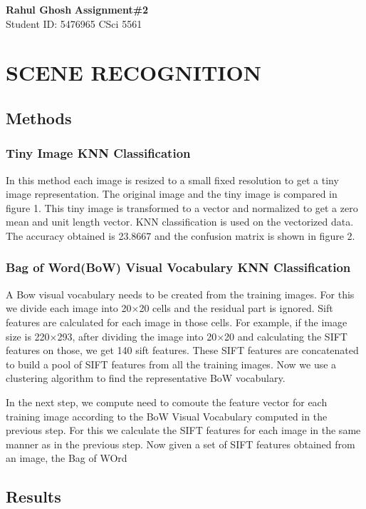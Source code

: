 \documentclass[letter, 10pt]{article}
\begin{document}
\noindent
\large \textbf{Rahul Ghosh} \hfill \textbf{Assignment\#2}\\
\normalsize Student ID: 5476965 \hfill CSci 5561\\

\section*{SCENE RECOGNITION}
\subsection*{Methods}
\subsubsection*{Tiny Image KNN Classification}
In this method each image is resized to a small fixed resolution to get a tiny image representation. The original image and the tiny image is compared in figure 1. This tiny image is transformed to a vector and normalized to get a zero mean and unit length vector. KNN classification is used on the vectorized data. The accuracy obtained is 23.8667 and the confusion matrix is shown in figure 2.

\subsubsection*{Bag of Word(BoW) Visual Vocabulary KNN Classification}
A Bow visual vocabulary needs to be created from the training images. For this we divide each image into 20$\times$20 cells and the residual part is ignored. Sift features are calculated for each image in those cells.  For example, if the image size is 220$\times$293, after dividing the image into 20$\times$20 and calculating the SIFT features on those, we get 140 sift features. These SIFT features are concatenated to build a pool of SIFT features from all the training images. Now we use a clustering algorithm to find the representative BoW vocabulary.

In the next step, we compute need to comoute the feature vector for each training image according to the  BoW Visual Vocabulary computed in the previous step. For this we calculate the SIFT features for each image in the same manner as in the previous step. Now given a set of SIFT features obtained from an image, the Bag of WOrd



\subsection*{Results}
\end{document}
